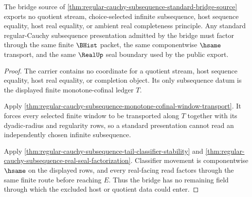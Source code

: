 \begin{theorem}
\label{thm:regular-cauchy-subsequence-bridge-non-escape}
The bridge source of \autoref{thm:regular-cauchy-subsequence-standard-bridge-source} exports no quotient stream, choice-selected infinite subsequence, host sequence equality, host real equality, or ambient real completeness principle. Any standard regular-Cauchy subsequence presentation admitted by the bridge must factor through the same finite $\BHist$ packet, the same componentwise $\hsame$ transport, and the same $\RealUp$ seal boundary used by the public export.
\end{theorem}
\begin{proof}
The carrier contains no coordinate for a quotient stream, host sequence equality, host real equality, or completion object. Its only subsequence datum is the displayed finite monotone-cofinal ledger $T$.

Apply \autoref{thm:regular-cauchy-subsequence-monotone-cofinal-window-transport}. It forces every selected finite window to be transported along $T$ together with its dyadic-radius and regularity rows, so a standard presentation cannot read an independently chosen infinite subsequence.

Apply \autoref{thm:regular-cauchy-subsequence-tail-classifier-stability} and \autoref{thm:regular-cauchy-subsequence-real-seal-factorization}. Classifier movement is componentwise $\hsame$ on the displayed rows, and every real-facing read factors through the same finite route before reaching $E$. Thus the bridge has no remaining field through which the excluded host or quotient data could enter.
\end{proof}

